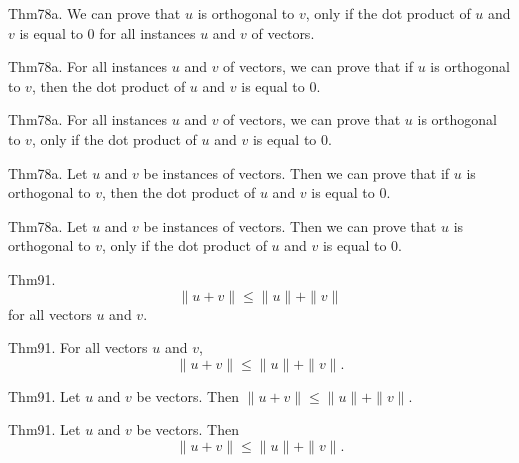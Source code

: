 \documentclass{article}
\begin{document}
Thm78a. We can prove that $u$ is orthogonal to $v$, only if the dot product of $u$ and $v$ is equal to $0$ for all instances $u$ and $v$ of vectors.

Thm78a. For all instances $u$ and $v$ of vectors, we can prove that if $u$ is orthogonal to $v$, then the dot product of $u$ and $v$ is equal to $0$.

Thm78a. For all instances $u$ and $v$ of vectors, we can prove that $u$ is orthogonal to $v$, only if the dot product of $u$ and $v$ is equal to $0$.

Thm78a. Let $u$ and $v$ be instances of vectors. Then we can prove that if $u$ is orthogonal to $v$, then the dot product of $u$ and $v$ is equal to $0$.

Thm78a. Let $u$ and $v$ be instances of vectors. Then we can prove that $u$ is orthogonal to $v$, only if the dot product of $u$ and $v$ is equal to $0$.

Thm91. $$\| u + v \| \leq \| u \| + \| v \|$$ for all vectors $u$ and $v$.

Thm91. For all vectors $u$ and $v$, $$\| u + v \| \leq \| u \| + \| v \|.$$

Thm91. Let $u$ and $v$ be vectors. Then $\| u + v \| \leq \| u \| + \| v \|$.

Thm91. Let $u$ and $v$ be vectors. Then $$\| u + v \| \leq \| u \| + \| v \|.$$
\end{document}
